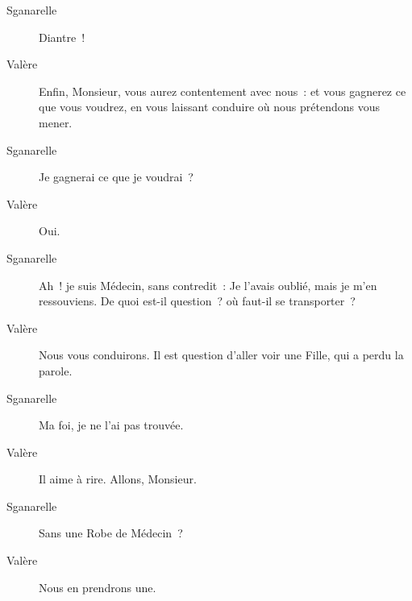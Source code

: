 \documentclass[french,twoside]{book} %
\begin{document}
 \begin{description} \item[Sganarelle] 

Diantre !\end{description}
 \begin{description} \item[Valère] 

Enfin, Monsieur, vous aurez contentement avec nous : et vous gagnerez ce que vous voudrez, en vous laissant conduire où nous prétendons vous mener.\end{description}
 \begin{description} \item[Sganarelle] 

Je gagnerai ce que je voudrai ?\end{description}
 \begin{description} \item[Valère] 

Oui.\end{description}
 \begin{description} \item[Sganarelle] 

Ah ! je suis Médecin, sans contredit : Je l’avais oublié, mais je m’en ressouviens. De quoi est-il question ? où faut-il se transporter ?\end{description}
 \begin{description} \item[Valère] 

Nous vous conduirons. Il est question d’aller voir une Fille, qui a perdu la parole.\end{description}
 \begin{description} \item[Sganarelle] 

Ma foi, je ne l’ai pas trouvée.\end{description}
 \begin{description} \item[Valère] 

Il aime à rire. Allons, Monsieur.\end{description}
 \begin{description} \item[Sganarelle] 

Sans une Robe de Médecin ?\end{description}
 \begin{description} \item[Valère] 

Nous en prendrons une.\end{description}
\end{document}
